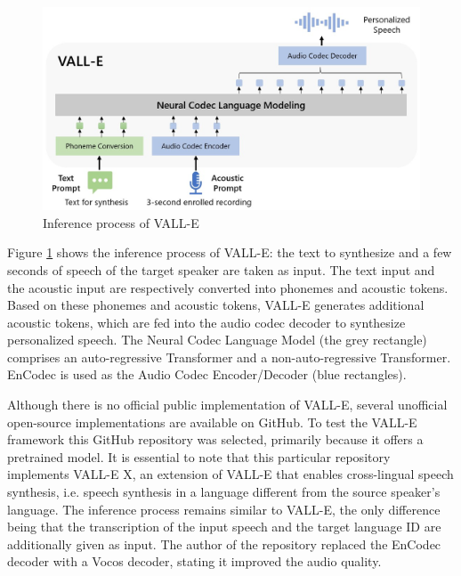 \begin{figure}[h!]
    \centering
    \includegraphics[width=1\linewidth]{assets/VALLE_Overview.jpg}
    \caption{Inference process of VALL-E\cite{wang2301neural}}
    \label{fig:valle_overview}
\end{figure}

Figure \ref{fig:valle_overview} shows the inference process of VALL-E: the text to synthesize and a few seconds of speech of the target speaker are taken as input. The text input and the acoustic input are respectively converted into phonemes and acoustic tokens. Based on these phonemes and acoustic tokens, VALL-E generates additional acoustic tokens, which are fed into the audio codec decoder to synthesize personalized speech. The Neural Codec Language Model (the grey rectangle) comprises an auto-regressive Transformer and a non-auto-regressive Transformer. EnCodec\cite{defossez2022high} is used as the Audio Codec Encoder/Decoder (blue rectangles). 

Although there is no official public implementation of VALL-E, several unofficial open-source implementations are available on GitHub\cite{valle, niu_vall-e_2023, songting_vall-e_2023}. To test the VALL-E framework this GitHub repository\cite{songting_vall-e_2023} was selected, primarily because it offers a pretrained model. It is essential to note that this particular repository implements VALL-E X\cite{zhang2023speak}, an extension of VALL-E that enables cross-lingual speech synthesis, i.e. speech synthesis in a language different from the source speaker's language. The inference process remains similar to VALL-E, the only difference being that the transcription of the input speech and the target language ID are additionally given as input. The author of the repository replaced the EnCodec decoder with a Vocos decoder\cite{siuzdak2023vocos}, stating it improved the audio quality. 

